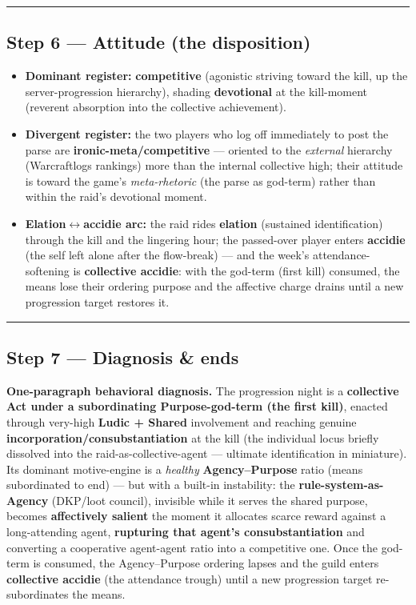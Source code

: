 \documentclass[11pt]{report}
\begin{document}
\vspace{0.4em}\hrule\vspace{0.8em}


\subsection{Step 6 — Attitude (the disposition)}


\begin{itemize}
\item \textbf{Dominant register:} \textbf{competitive} (agonistic striving toward the kill, up the server-progression hierarchy), shading \textbf{devotional} at the kill-moment (reverent absorption into the collective achievement).
\item \textbf{Divergent register:} the two players who log off immediately to post the parse are \textbf{ironic-meta/competitive} — oriented to the \textit{external} hierarchy (Warcraftlogs rankings) more than the internal collective high; their attitude is toward the game's \textit{meta-rhetoric} (the parse as god-term) rather than within the raid's devotional moment.
\item \textbf{Elation$\leftrightarrow$\allowbreak accidie arc:} the raid rides \textbf{elation} (sustained identification) through the kill and the lingering hour; the passed-over player enters \textbf{accidie} (the self left alone after the flow-break) — and the week's attendance-softening is \textbf{collective accidie}: with the god-term (first kill) consumed, the means lose their ordering purpose and the affective charge drains until a new progression target restores it.
\end{itemize}


\vspace{0.4em}\hrule\vspace{0.8em}


\subsection{Step 7 — Diagnosis \& ends}


\textbf{One-paragraph behavioral diagnosis.} The progression night is a \textbf{collective Act under a subordinating Purpose-god-term (the first kill)}, enacted through very-high \textbf{Ludic + Shared} involvement and reaching genuine \textbf{incorporation/consubstantiation} at the kill (the individual locus briefly dissolved into the raid-as-collective-agent — ultimate identification in miniature). Its dominant motive-engine is a \textit{healthy} \textbf{Agency–Purpose} ratio (means subordinated to end) — but with a built-in instability: the \textbf{rule-system-as-Agency} (DKP/loot council), invisible while it serves the shared purpose, becomes \textbf{affectively salient} the moment it allocates scarce reward against a long-attending agent, \textbf{rupturing that agent's consubstantiation} and converting a cooperative agent-agent ratio into a competitive one. Once the god-term is consumed, the Agency–Purpose ordering lapses and the guild enters \textbf{collective accidie} (the attendance trough) until a new progression target re-subordinates the means.
\end{document}
